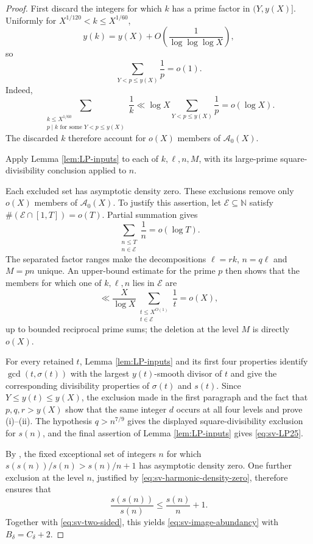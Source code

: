\documentclass[11pt,letterpaper,reqno]{amsart}
\numberwithin{equation}{section}
\theoremstyle{remark}
\newcommand{\N}{\mathbb{N}}
\newcommand{\1}{\mathbf 1}
\renewcommand{\leq}{\leqslant}
\begin{document}
\begin{proof}
First discard the integers for which $k$ has a prime factor in
$(Y,y(X)]$. Uniformly for $X^{1/120}<k\leq X^{1/60}$,
\[
 y(k)=y(X)+O\!\left(\frac1{\log\log\log X}\right),
\]
so
\[
 \sum_{Y<p\leq y(X)}\frac1p=o(1).
\]
Indeed,
\[
 \sum_{\substack{k\leq X^{1/60}\\
 p\mid k\text{ for some }Y<p\leq y(X)}}\frac1k
 \ll \log X\sum_{Y<p\leq y(X)}\frac1p=o(\log X).
\]
The discarded $k$ therefore account for $o(X)$ members of
$\mathcal{A}_0(X)$.

Apply Lemma \ref{lem:LP-inputs} to each of $k,\ell,n,M$, with its
large-prime square-divisibility conclusion applied to $n$.

Each excluded set has asymptotic density zero. These exclusions remove only
$o(X)$ members of $\mathcal{A}_0(X)$. To justify this assertion, let
$\mathcal{E}\subseteq\N$ satisfy
$\#(\mathcal{E}\cap[1,T])=o(T)$. Partial summation gives
\begin{equation}\label{eq:sv-harmonic-density-zero}
 \sum_{\substack{n\leq T\\n\in\mathcal{E}}}\frac1n=o(\log T).
\end{equation}
The separated factor ranges make the decompositions
$\ell=rk$, $n=q\ell$ and $M=pn$ unique. An upper-bound estimate for the
prime $p$ then shows that the members for which one of $k,\ell,n$ lies in
$\mathcal{E}$ are
\[
 \ll\frac{X}{\log X}
 \sum_{\substack{t\leq X^{O(1)}\\t\in\mathcal{E}}}\frac1t=o(X),
\]
up to bounded reciprocal prime sums; the deletion at the level $M$ is
directly $o(X)$.

For every retained $t$, Lemma \ref{lem:LP-inputs} and its first four
properties identify $\gcd(t,\sigma(t))$ with the largest $y(t)$-smooth
divisor of $t$ and give the corresponding divisibility properties of
$\sigma(t)$ and $s(t)$. Since $Y\leq y(t)\leq y(X)$, the exclusion made in
the first paragraph and the fact that $p,q,r>y(X)$ show that the same integer
$d$ occurs at all four levels and prove \textup{(i)--(ii)}. The hypothesis
$q>n^{7/9}$ gives the displayed square-divisibility exclusion for $s(n)$,
and the final assertion of Lemma \ref{lem:LP-inputs} gives
\eqref{eq:sv-LP25}.

By \cite[Theorem~1.4]{Pollack}, the fixed exceptional set of integers $n$
for which $s(s(n))/s(n)>s(n)/n+1$ has asymptotic density zero.
One further exclusion at the level $n$, justified by
\eqref{eq:sv-harmonic-density-zero}, therefore ensures that
\[
 \frac{s(s(n))}{s(n)}
 \leq \frac{s(n)}n+1.
\]
Together with \eqref{eq:sv-two-sided}, this yields
\eqref{eq:sv-image-abundancy} with $B_\delta=C_\delta+2$.
\end{proof}
\end{document}
